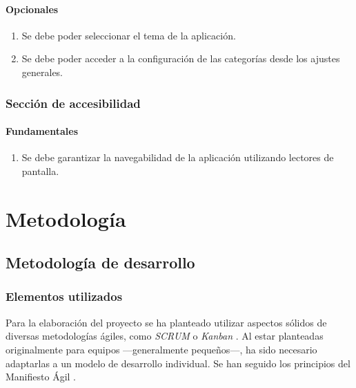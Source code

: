 \documentclass[10pt, a4paper]{aqademic}
\begin{document}
\subsubsection*{Opcionales}

\begin{enumerate}[resume]
	\item Se debe poder seleccionar el tema de la aplicación.
	
	\item Se debe poder acceder a la configuración de las categorías desde los ajustes generales.
\end{enumerate}


\subsection*{Sección de accesibilidad}

\subsubsection*{Fundamentales}

\begin{enumerate}[resume]
	\item Se debe garantizar la navegabilidad de la aplicación utilizando lectores de pantalla.
\end{enumerate}


\chapter{Metodología}

\section{Metodología de desarrollo}

\subsection{Elementos utilizados}

Para la elaboración del proyecto se ha planteado utilizar aspectos sólidos de diversas metodologías ágiles, como \textit{SCRUM} \cite{schwaber2017scrum} o \textit{Kanban} \cite{kanban}. Al estar planteadas originalmente para equipos ---generalmente pequeños---, ha sido necesario adaptarlas a un modelo de desarrollo individual. Se han seguido los principios del Manifiesto Ágil \cite{beck2001agile}.

\medskip
\end{document}
